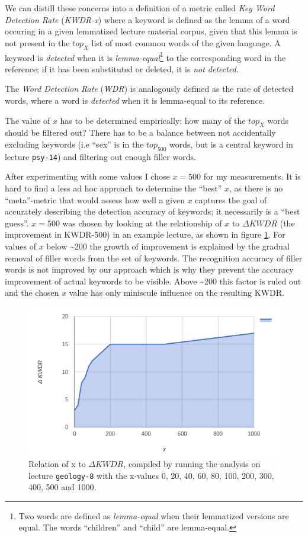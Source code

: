 \documentclass[]{article}
\begin{document}
We can distill these concerns into a definition of a metric called
\emph{Key Word Detection Rate} (\emph{KWDR-x}) where a keyword is
defined as the lemma of a word occuring in a given lemmatized lecture
material corpus, given that this lemma is not present in the \(top_X\)
list of most common words of the given language. A keyword is
\emph{detected} when it is \emph{lemma-equal}\footnote{Two words are
  defined as \emph{lemma-equal} when their lemmatized versions are
  equal. The words ``children'' and ``child'' are lemma-equal.} to the
corresponding word in the reference; if it has been substituted or
deleted, it is \emph{not detected}.

The \emph{Word Detection Rate} (\emph{WDR}) is analogously defined as
the rate of detected words, where a word is \emph{detected} when it is
lemma-equal to its reference.

The value of \(x\) has to be determined empirically: how many of the
\(top_X\) words should be filtered out? There has to be a balance
between not accidentally excluding keywords (i.e ``sex'' is in the
\(top_{500}\) words, but is a central keyword in lecture
\texttt{psy-14}) and filtering out enough filler words.

After experimenting with some values I chose \(x=500\) for my
measurements. It is hard to find a less ad hoc approach to determine the
``best'' \(x\), as there is no ``meta''-metric that would assess how
well a given \(x\) captures the goal of accurately describing the
detection accuracy of keywords; it necessarily is a ``best guess''.
\(x=500\) was chosen by looking at the relationship of \(x\) to
\(\Delta KWDR\) (the improvement in KWDR-500) in an example lecture, as
shown in figure \ref{x-to-KWDR}. For values of \(x\) below
\textasciitilde{}200 the growth of improvement is explained by the
gradual removal of filler words from the set of keywords. The
recognition accuracy of filler words is not improved by our approach
which is why they prevent the accuracy improvement of actual keywords to
be visible. Above \textasciitilde{}200 this factor is ruled out and the
chosen \(x\) value has only miniscule influence on the resulting KWDR.

\begin{figure}[htbp]
\centering
\includegraphics{images/kwdr_150.png}
\caption{Relation of x to \(\Delta KWDR\), compiled by running the
analysis on lecture \texttt{geology-8} with the x-values 0, 20, 40, 60,
80, 100, 200, 300, 400, 500 and 1000.\label{x-to-KWDR}}
\end{figure}
\end{document}
